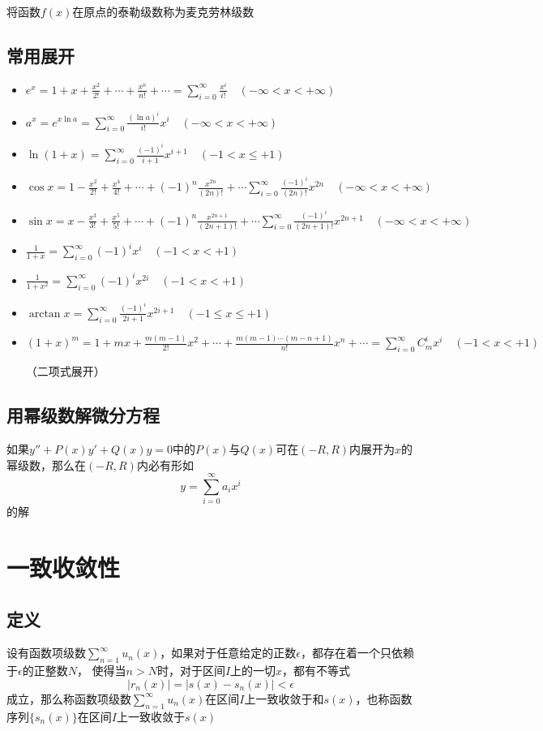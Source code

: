 \documentclass[UTF8]{ctexart}
\newcommand{\abs}[1]{{\left|{#1}\right|}}
\begin{document}
将函数$f(x)$在原点的泰勒级数称为麦克劳林级数

\subsection*{常用展开}
\begin{itemize}
  \item $\displaystyle e^x=1+x+\frac{x^2}{2!}+\cdots+\frac{x^n}{n!}+\cdots=\sum_{i=0}^\infty \frac{x^i}{i!}\quad(-\infty<x<+\infty)$
  \item $\displaystyle a^x=e^{x\ln a}=\sum_{i=0}^\infty\frac{(\ln a)^i}{i!}x^i \quad(-\infty<x<+\infty)$
  \item $\displaystyle \ln(1+x)=\sum_{i=0}^\infty\frac{(-1)^i}{i+1}x^{i+1} \quad(-1<x\le+1)$
  \item $\displaystyle \cos x=1-\frac{x^2}{2!}+\frac{x^4}{4!}+\cdots+(-1)^n\frac{x^{2n}}{(2n)!}+\cdots \sum_{i=0}^\infty\frac{(-1)^i}{(2n)!}x^{2n}\quad(-\infty<x<+\infty)$
  \item $\displaystyle \sin x=x-\frac{x^3}{3!}+\frac{x^5}{5!}+\cdots+(-1)^n\frac{x^{2n+1}}{(2n+1)!}+\cdots \sum_{i=0}^\infty\frac{(-1)^i}{(2n+1)!}x^{2n+1}\quad(-\infty<x<+\infty)$
  \item $\displaystyle \frac{1}{1+x}=\sum_{i=0}^\infty(-1)^ix^i \quad(-1<x<+1)$
  \item $\displaystyle \frac{1}{1+x^2}=\sum_{i=0}^\infty(-1)^ix^{2i} \quad(-1<x<+1)$
  \item $\displaystyle \arctan x = \sum_{i=0}^\infty\frac{(-1)^i}{2i+1}x^{2i+1}\quad(-1\le x\le+1)$
  \item $\displaystyle (1+x)^m = 1+mx+\frac{m(m-1)}{2!}x^2+\cdots+\frac{m(m-1)\cdots(m-n+1)}{n!}x^n+\cdots=\sum_{i=0}^\infty C_m^ix^i\quad(-1< x<+1)$

  （二项式展开）
\end{itemize}

\subsection*{用幂级数解微分方程}
如果$y''+P(x)y'+Q(x)y=0$中的$P(x)$与$Q(x)$可在$(-R,R)$内展开为$x$的幂级数，那么在$(-R,R)$内必有形如
\[y=\sum_{i=0}^\infty a_ix^i\]
的解

\section*{一致收敛性}
\subsection*{定义}
设有函数项级数$\displaystyle\sum_{n=1}^\infty u_n(x)$，如果对于任意给定的正数$\epsilon$，都存在着一个只依赖于$\epsilon$的正整数$N$，
使得当$n>N$时，对于区间$I$上的一切$x$，都有不等式
\[ \abs{r_n(x)}=\abs{s(x)-s_n(x)}<\epsilon \]
成立，那么称函数项级数$\displaystyle\sum_{n=1}^\infty u_n(x)$在区间$I$上一致收敛于和$s(x)$，也称函数序列$\{ s_n(x) \}$在区间$I$上一致收敛于$s(x)$
\end{document}
